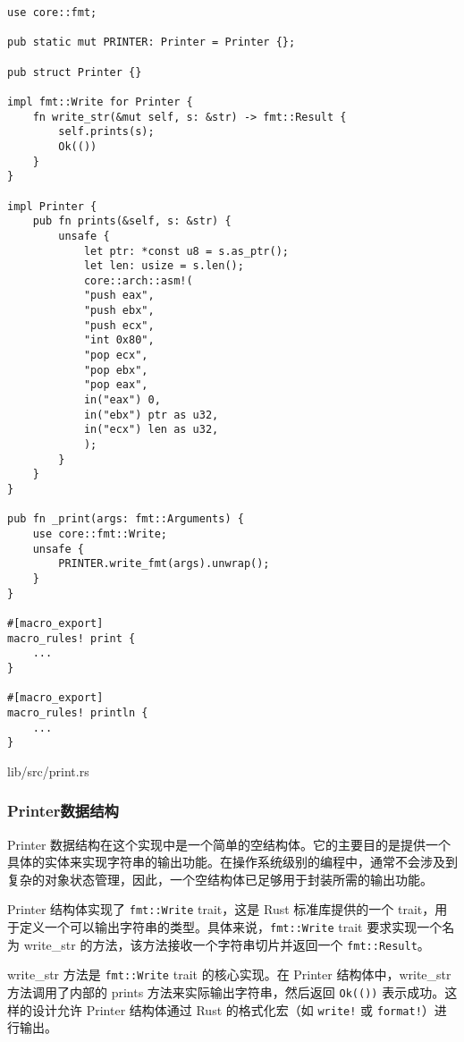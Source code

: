 \begin{listing}[htbp]
    \begin{verbatim}
use core::fmt;

pub static mut PRINTER: Printer = Printer {};

pub struct Printer {}

impl fmt::Write for Printer {
    fn write_str(&mut self, s: &str) -> fmt::Result {
        self.prints(s);
        Ok(())
    }
}

impl Printer {
    pub fn prints(&self, s: &str) {
        unsafe {
            let ptr: *const u8 = s.as_ptr();
            let len: usize = s.len();
            core::arch::asm!(
            "push eax",
            "push ebx",
            "push ecx",
            "int 0x80",
            "pop ecx",
            "pop ebx",
            "pop eax",
            in("eax") 0,
            in("ebx") ptr as u32,
            in("ecx") len as u32,
            );
        }
    }
}

pub fn _print(args: fmt::Arguments) {
    use core::fmt::Write;
    unsafe {
        PRINTER.write_fmt(args).unwrap();
    }
}

#[macro_export]
macro_rules! print {
    ...
}

#[macro_export]
macro_rules! println {
    ...
}
    \end{verbatim}
    \caption{lib/src/print.rs}\label{lst:LibSrcPrintRust}
\end{listing}

\subsubsection{Printer数据结构}

Printer 数据结构在这个实现中是一个简单的空结构体。它的主要目的是提供一个具体的实体来实现字符串的输出功能。在操作系统级别的编程中，通常不会涉及到复杂的对象状态管理，因此，一个空结构体已足够用于封装所需的输出功能。

Printer 结构体实现了 \texttt{fmt::Write} trait，这是 Rust 标准库提供的一个 trait，用于定义一个可以输出字符串的类型。具体来说，\texttt{fmt::Write} trait 要求实现一个名为 write\_str 的方法，该方法接收一个字符串切片并返回一个 \texttt{fmt::Result}。

write\_str 方法是 \texttt{fmt::Write} trait 的核心实现。在 Printer 结构体中，write\_str 方法调用了内部的 prints 方法来实际输出字符串，然后返回 \texttt{Ok(())} 表示成功。这样的设计允许 Printer 结构体通过 Rust 的格式化宏（如 \texttt{write!} 或 \texttt{format!}）进行输出。

